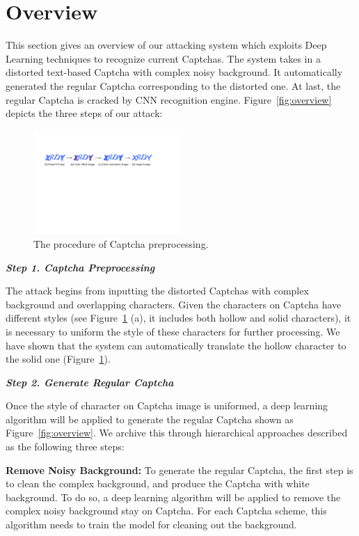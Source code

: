 \section{Overview}

This section gives an overview of our attacking system which exploits Deep Learning techniques to recognize current Captchas. The system takes in a distorted text-based Captcha with complex noisy background. It automatically generated the regular Captcha corresponding to the distorted one. At last, the regular Captcha is cracked by CNN recognition engine. Figure~\ref{fig:overview} depicts the three steps of our attack:

\begin{figure}
  \centering
  \includegraphics[width=0.5\textwidth]{fig/fill_color.pdf}
  \caption{The procedure of Captcha preprocessing.}
  \label{fig:fill_color}
\end{figure}

\noindent \textbf{\emph{Step 1. Captcha Preprocessing}}

The attack begins from inputting the distorted Captchas with complex background and overlapping characters. Given the characters on Captcha have different styles (see Figure~\ref{fig:fill_color} (a), it includes both hollow and solid characters), it is necessary to uniform the style of these characters for further processing. We have shown that the system can automatically translate the hollow character to the solid one (Figure~\ref{fig:fill_color}).

\noindent \textbf{\emph{Step 2. Generate Regular Captcha}}

Once the style of character on Captcha image is uniformed, a deep learning algorithm will be applied to generate the regular Captcha shown as Figure~\ref{fig:overview}. We archive this through hierarchical approaches described as the following three steps:

\noindent \circling{\textcolor{white}{1}} \textbf{Remove Noisy Background:}  To generate the regular Captcha, the first step is to clean the complex background, and produce the Captcha with white background.
To do so, a deep learning algorithm will be applied to remove the complex noisy background stay on Captcha.
For each Captcha scheme, this algorithm needs to train the model for cleaning out the background.

